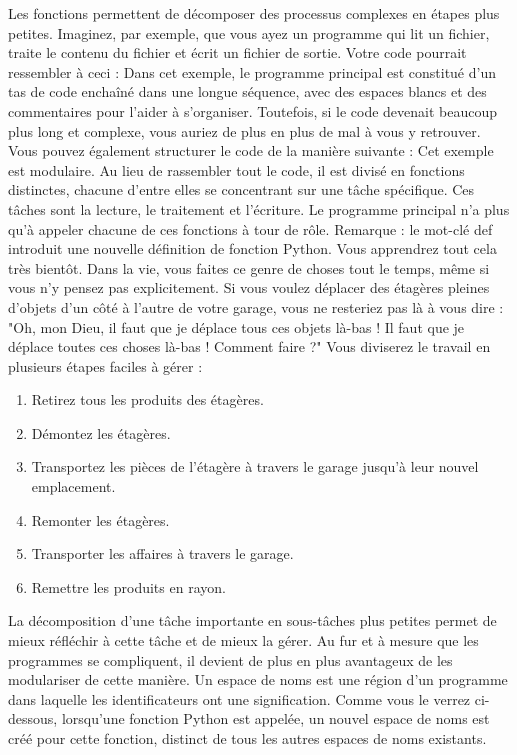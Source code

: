 Les fonctions permettent de décomposer des processus complexes en étapes plus petites.  Imaginez, par exemple, que vous ayez un programme qui lit un fichier, traite le contenu du fichier et écrit un fichier de sortie. Votre code pourrait ressembler à ceci :
Dans cet exemple, le programme principal est constitué d'un tas de code enchaîné dans une longue séquence, avec des espaces blancs et des commentaires pour l'aider à s'organiser.  Toutefois, si le code devenait beaucoup plus long et complexe, vous auriez de plus en plus de mal à vous y retrouver.
Vous pouvez également structurer le code de la manière suivante :
Cet exemple est modulaire.  Au lieu de rassembler tout le code, il est divisé en fonctions distinctes, chacune d'entre elles se concentrant sur une tâche spécifique. Ces tâches sont la lecture, le traitement et l'écriture. Le programme principal n'a plus qu'à appeler chacune de ces fonctions à tour de rôle.
Remarque : le mot-clé def introduit une nouvelle définition de fonction Python.  Vous apprendrez tout cela très bientôt.
Dans la vie, vous faites ce genre de choses tout le temps, même si vous n'y pensez pas explicitement.  Si vous voulez déplacer des étagères pleines d'objets d'un côté à l'autre de votre garage, vous ne resteriez pas là à vous dire : "Oh, mon Dieu, il faut que je déplace tous ces objets là-bas !  Il faut que je déplace toutes ces choses là-bas !  Comment faire ?"  Vous diviserez le travail en plusieurs étapes faciles à gérer :
\begin{enumerate}
\item Retirez tous les produits des étagères.
\item Démontez les étagères.
\item Transportez les pièces de l'étagère à travers le garage jusqu'à leur nouvel emplacement.
\item Remonter les étagères.
\item Transporter les affaires à travers le garage.
\item Remettre les produits en rayon.
\end{enumerate}
La décomposition d'une tâche importante en sous-tâches plus petites permet de mieux réfléchir à cette tâche et de mieux la gérer.  Au fur et à mesure que les programmes se compliquent, il devient de plus en plus avantageux de les modulariser de cette manière.
Un espace de noms est une région d'un programme dans laquelle les identificateurs ont une signification.  Comme vous le verrez ci-dessous, lorsqu'une fonction Python est appelée, un nouvel espace de noms est créé pour cette fonction, distinct de tous les autres espaces de noms existants.
